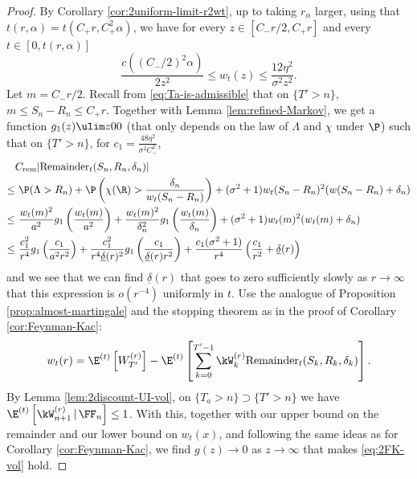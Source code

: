 \documentclass[10pt,a4paper]{article}
\begin{document}
\begin{proof}
By Corollary \ref{cor:2uniform-limit-r2wt}, up to taking $r_\alpha$ larger, using that $t(r,\alpha) = t(C_+ r, C_+^2 \alpha)$, we have for every $z\in [C_- r/2, C_+ r]$ and every $t\in [0,t(r,\alpha)]$
\[ \frac{c((C_-/2)^2 \alpha)}{2 z^2} \leq w_t(z) \leq \frac{12 \eta^2}{\sigma^2 z^2} . \] 
Let $m = C_- r/2$. 
Recall from \eqref{eq:Ta-is-admissible} that on $\{T' > n\}$, $m \leq S_n-R_n \leq C_+r$. Together with Lemma \ref{lem:refined-Markov}, we get a function $g_1(z)\ulim z 0 0$ (that only depends on the law of $\Lambda$ and $\chi$ under $\P$) such that on $\{T'>n\}$, for $c_1 = \frac{48 \eta^2}{\sigma^2 C_-^2}$, 
\begin{align*}
&C_\mathrm{rem} |\mathrm{Remainder}_t(S_n, R_n, \delta_n)| \\
\leq& \ \P(\Lambda>R_n) + \P\left(\chi(\R)>\frac{\delta_n}{w_t(S_n-R_n)}\right) + (\sigma^2+1) w_t(S_n-R_n)^2(w(S_n-R_n)+\delta_n) \\
\leq& \ \frac{w_t(m)^2}{a^2} g_1\left(\frac{w_t(m)}{a^2}\right) + \frac{w_t(m)^2}{\delta_n^2} g_1\left(\frac{w_t(m)}{\delta_n}\right) + (\sigma^2+1) w_t(m)^2 (w_t(m)+\delta_n) \\
\leq& \ \frac{c_1^2}{r^4} g_1\left(\frac{c_1}{a^2 r^2}\right) + \frac{c_1^2}{r^4 \underline{\delta}(r)^2} g_1\left(\frac{c_1}{\underline{\delta}(r) r^2}\right) + \frac{c_1 (\sigma^2+1)}{r^4}\left( \frac{c_1}{r^2} + \underline{\delta}(r)\right)
\end{align*}
and we see that we can find $\underline{\delta}(r)$ that goes to zero sufficiently slowly as $r\to\infty$ that this expression is $o(r^{-4})$ uniformly in $t$. 
%
Use the analogue of Proposition \ref{prop:almost-martingale} and the stopping theorem as in the proof of Corollary \ref{cor:Feynman-Kac}: 
\begin{align*}%
w_t(r) = \E^{(t)}\left[ W_{T'}^{(r)} \right] - \E^{(t)}\left[ \sum_{k=0}^{T'-1} \kW^{(r)}_k \mathrm{Remainder}_t(S_k, R_k, \delta_k) \right] .
\end{align*}
By Lemma \ref{lem:2discount-UI-vol}, on $\{T_a>n\} \supset \{T'>n\}$ we have $\E^{(t)}\left[\kW^{(r)}_{n+1} \, | \, \FF_n \right] \leq 1$. With this, together with our upper bound on the remainder and our lower bound on $w_t(x)$, and following the same ideas as for Corollary \ref{cor:Feynman-Kac}, we find $g(z) \to 0$ as $z\to \infty$ that makes \eqref{eq:2FK-vol} hold. 
\end{proof}
\end{document}
